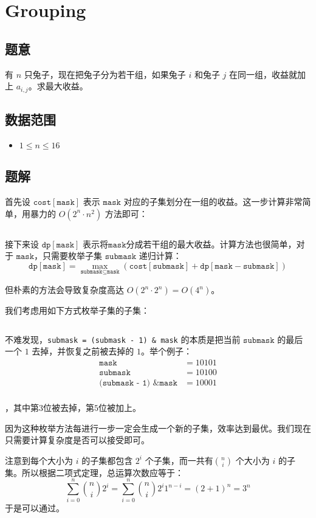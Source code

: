 \section{Grouping}
\subsection*{题意}
有 $n$ 只兔子，现在把兔子分为若干组，如果兔子 $i$ 和兔子 $j$ 在同一组，收益就加上 $ a_{i,j}$。求最大收益。
\subsection*{数据范围}
\begin{itemize}
\item $1 \leq n \leq 16$
\end{itemize}


\subsection*{题解}

首先设 $\texttt{cost}[\texttt{mask}]$ 表示 $\texttt{mask}$ 对应的子集划分在一组的收益。这一步计算非常简单，用暴力的 $O(2^n\cdot n^2)$ 方法即可：
\inputminted[linenos,autogobble]{cpp}{./Code/U2.cpp}

接下来设 $\texttt{dp}[\texttt{mask}]$ 表示将$\texttt{mask}$分成若干组的最大收益。计算方法也很简单，对于 $\texttt{mask}$，只需要枚举子集 $\texttt{submask}$ 递归计算：
$$
\texttt{dp}[\texttt{mask}] = \max_{\texttt{submask} \subseteq \texttt{mask}} (\texttt{cost}[\texttt{submask}] + \texttt{dp}[\texttt{mask} - \texttt{submask}])
$$

但朴素的方法会导致复杂度高达 $O(2^n \cdot 2^n) = O(4^n)$。

我们考虑用如下方式枚举子集的子集：
\inputminted[linenos,autogobble]{cpp}{./Code/U3.cpp}

不难发现，\texttt{submask = (submask - 1) & mask} 的本质是把当前 $\texttt{submask}$ 的最后一个 $1$ 去掉，并恢复之前被去掉的 $1$。举个例子：
\begin{align*}
    \texttt{mask} &= 10101\\
    \texttt{submask} &= 10100\\
    \texttt{(submask - 1) \& mask} &= 10001\\
\end{align*}

，其中第$3$位被去掉，第$5$位被加上。

因为这种枚举方法每进行一步一定会生成一个新的子集，效率达到最优。我们现在只需要计算复杂度是否可以接受即可。

注意到每个大小为 $i$ 的子集都包含 $2^i$ 个子集，而一共有$\displaystyle\binom{n}{i}$ 个大小为 $i$ 的子集。所以根据二项式定理，总运算次数应等于：
$$
\sum_{i = 0}^n \binom{n}{i}2^i = \sum_{i = 0}^n \binom{n}{i}2^i1^{n-i} = (2+1)^n = 3^n
$$
于是可以通过。

\newpage